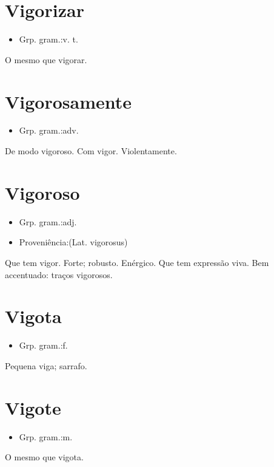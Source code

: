 \documentclass{article}
\begin{document}
\section{Vigorizar}
\begin{itemize}
\item {Grp. gram.:v. t.}
\end{itemize}
O mesmo que \textunderscore vigorar\textunderscore .
\section{Vigorosamente}
\begin{itemize}
\item {Grp. gram.:adv.}
\end{itemize}
De modo vigoroso.
Com vigor.
Violentamente.
\section{Vigoroso}
\begin{itemize}
\item {Grp. gram.:adj.}
\end{itemize}
\begin{itemize}
\item {Proveniência:(Lat. \textunderscore vigorosus\textunderscore )}
\end{itemize}
Que tem vigor.
Forte; robusto.
Enérgico.
Que tem expressão viva.
Bem accentuado: \textunderscore traços vigorosos\textunderscore .
\section{Vigota}
\begin{itemize}
\item {Grp. gram.:f.}
\end{itemize}
Pequena viga; sarrafo.
\section{Vigote}
\begin{itemize}
\item {Grp. gram.:m.}
\end{itemize}
O mesmo que \textunderscore vigota\textunderscore .
\end{document}
